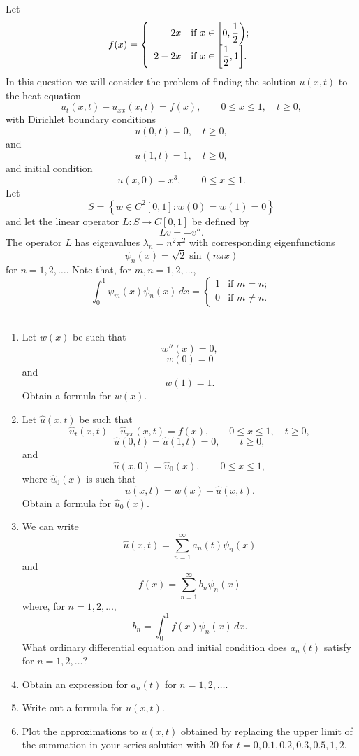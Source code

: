 
Let
\[
f(x)=\left\{\begin{array}{rl}\displaystyle{2x}&\displaystyle{\mbox{if }x\in\left[0,{1\over2}\right)};\\\displaystyle{2-2x}&\displaystyle{\mbox{if }x\in\left[{1\over2},1\right]}.\end{array}\right.
\]
In this question we will consider the problem of finding the solution $u(x,t)$ to the heat equation
\[ 
u_t(x,t)-u_{xx}(x,t) = f(x), \qquad 0\le x \le 1, \quad t\ge 0,
\]
with Dirichlet boundary conditions
\[
u(0,t)=0, \quad t\ge 0,
\]
and
\[
u(1,t)=1, \quad t\ge 0,
\]
and initial condition
\[
u(x,0) = x^3, \qquad 0\le x\le 1.
\]
Let
\[
S = \left\{ w \in C^2[0,1] : w(0) = w(1) = 0 \right\}
\]
and let the linear operator $L: S\to C[0,1]$ be defined by
\[
L v = -v''.
\]
The operator $L$ has eigenvalues $\lambda_n=n^2\pi^2$ with corresponding eigenfunctions
\[
\psi_n(x) = \sqrt{2} \sin\left(n\pi x\right)
\]
for $n=1,2,\ldots$. Note that, for $m,n=1,2,\ldots$,
\[
\int_0^1\psi_m(x)\psi_n(x)\,dx=\left\{\begin{array}{rl}1&\mbox{if }m=n;\\0&\mbox{if }m\ne n.\end{array}\right.
\]
\\
\begin{enumerate}
\item Let $w(x)$ be such that
\[
w''(x)=0,
\]
\[
w(0)=0
\]
and
\[
w(1)=1.
\]
Obtain a formula for $w(x)$.
\\
\item Let $\hat{u}(x,t)$ be such that
\[ 
\hat{u}_t(x,t)-\hat{u}_{xx}(x,t) = f(x), \qquad 0\le x \le 1, \quad t\ge 0,
\]
\[
\hat{u}(0,t)=\hat{u}(1,t)=0, \qquad t\ge 0,
\]
and
\[
\hat{u}(x,0) = \hat{u}_0(x), \qquad 0\le x\le 1,
\]
where $\hat{u}_0(x)$ is such that
\[
u(x,t) = w(x)+\hat{u}(x,t).
\]
Obtain a formula for $\hat{u}_0(x)$.
\\
\item We can write
\[
\hat{u}(x,t) = \sum_{n=1}^\infty a_n(t) \psi_n(x)
\]
and
\[
f(x) = \sum_{n=1}^\infty b_n\psi_n(x)
\]
where, for $n = 1,2,\ldots$,
\[
b_n = \int_0^1f(x) \psi_n(x)\,dx.
\]
What ordinary differential equation and initial condition does $a_n(t)$ satisfy for $n = 1,2,\ldots$?
\\
\item Obtain an expression for $a_n(t)$ for $n=1,2,\ldots$.
\\
\item Write out a formula for $u(x,t)$.
\\
\item Plot the approximations to $u(x,t)$ obtained by replacing the upper limit of the summation in your series solution with $20$ for $t=0,0.1,0.2,0.3,0.5,1,2$.
\end{enumerate}




